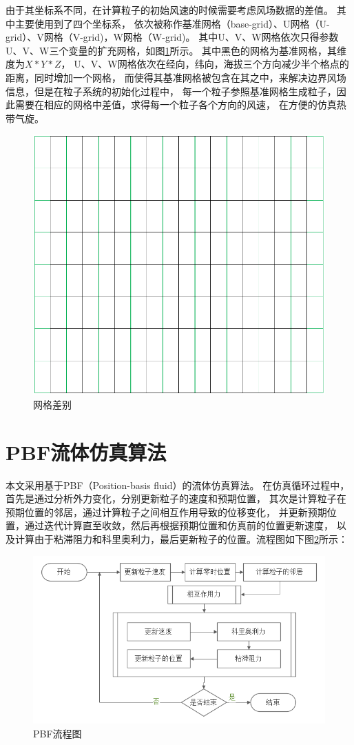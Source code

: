 由于其坐标系不同，在计算粒子的初始风速的时候需要考虑风场数据的差值。
其中主要使用到了四个坐标系，
依次被称作基准网格（base-grid）、U网格（U-grid）、V网格（V-grid)，W网格（W-grid)。
其中U、V、W网格依次只得参数U、V、W三个变量的扩充网格，如图\ref{fig:diff-grid}所示。
其中黑色的网格为基准网格，其维度为$X*Y*Z$，
U、V、W网格依次在经向，纬向，海拔三个方向减少半个格点的距离，同时增加一个网格，
而使得其基准网格被包含在其之中，来解决边界风场信息，但是在粒子系统的初始化过程中，
每一个粒子参照基准网格生成粒子，因此需要在相应的网格中差值，求得每一个粒子各个方向的风速，
在方便的仿真热带气旋。
\begin{figure}
	\centering 
	\includegraphics[width=200bp]{figure/grid.png}
	\caption{网格差别}
	\label{fig:diff-grid}
\end{figure}

\section{PBF流体仿真算法}


本文采用基于PBF（Position-basis fluid）的流体仿真算法。
在仿真循环过程中，首先是通过分析外力变化，分别更新粒子的速度和预期位置，
其次是计算粒子在预期位置的邻居，通过计算粒子之间相互作用导致的位移变化，
并更新预期位置，通过迭代计算直至收敛，然后再根据预期位置和仿真前的位置更新速度，
以及计算由于粘滞阻力和科里奥利力，最后更新粒子的位置。流程图如下图\ref{fig:pbf-flow-chart}所示：
\begin{figure}
	\centering
	\includegraphics[width = 350bp]{figure/PBF-flow-chart.png}
	\caption{PBF流程图}
	\label{fig:pbf-flow-chart}
\end{figure}

